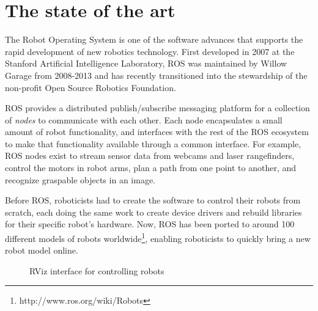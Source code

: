 \documentclass[11pt,twocolumn]{article}
\begin{document}

\section{The state of the art}


The Robot Operating System\cite{ros} is one of the software advances that supports the rapid development of new robotics technology.  First developed in 2007 at the Stanford Artificial Intelligence Laboratory, ROS was maintained by Willow Garage from 2008-2013 and has recently transitioned into the stewardship of the non-profit Open Source Robotics Foundation.

ROS provides a distributed publish/subscribe messaging platform for a collection of {\em nodes} to communicate with each other. Each node encapsulates a small amount of robot functionality, and interfaces with the rest of the ROS ecosystem to make that functionality available through a common interface. For example, ROS nodes exist to stream sensor data from webcams and laser rangefinders, control the motors in robot arms, plan a path from one point to another, and recognize graspable objects in an image.

Before ROS, roboticists had to create the software to control their robots from scratch, each doing the same work to create device drivers and rebuild libraries for their specific robot's hardware.  Now, ROS has been ported to around 100 different models of robots worldwide\footnote{http://www.ros.org/wiki/Robots}, enabling roboticists to quickly bring a new robot model online.

\begin{figure}[tbh]
\center{}
\caption{RViz interface for controlling robots}
\label{rviz}
\end{figure}
\end{document}
